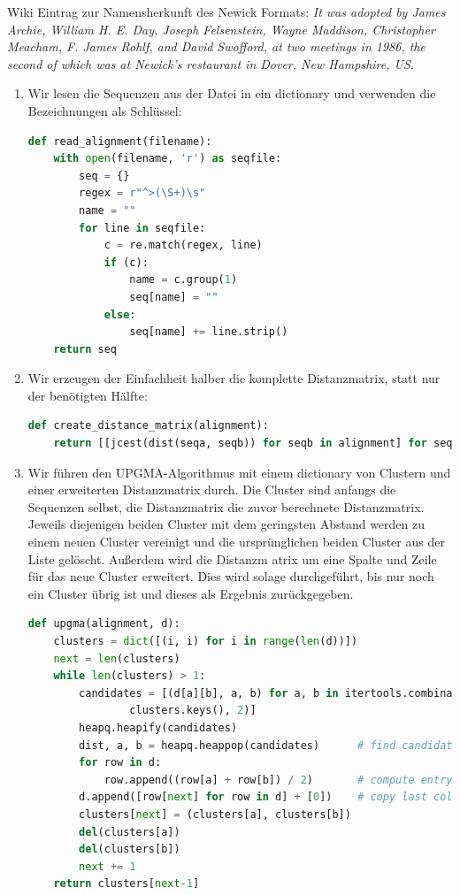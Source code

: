 \documentclass{homework}
\begin{document}
\begin{enumerate}
Wiki Eintrag zur Namensherkunft des Newick Formats: \textit{It was adopted by James Archie, William H. E. Day, Joseph Felsenstein, Wayne Maddison, Christopher Meacham, F. James Rohlf, and David Swofford, at two meetings in 1986, the second of which was at Newick's restaurant in Dover, New Hampshire, US.}

\begin{enumerate}
\item Wir lesen die Sequenzen aus der Datei in ein dictionary und verwenden die
Bezeichnungen als Schlüssel:

\begin{lstlisting}[language=python]
def read_alignment(filename):
	with open(filename, 'r') as seqfile:
		seq = {}
		regex = r"^>(\S+)\s"
		name = ""
		for line in seqfile:
			c = re.match(regex, line)
			if (c):
				name = c.group(1)
				seq[name] = ""
			else:
				seq[name] += line.strip()
	return seq
\end{lstlisting}

\item Wir erzeugen der Einfachheit halber die komplette Distanzmatrix, statt nur
der benötigten Hälfte:

\begin{lstlisting}[language=python]
def create_distance_matrix(alignment):
	return [[jcest(dist(seqa, seqb)) for seqb in alignment] for seqa in alignment]
\end{lstlisting}

\item Wir führen den UPGMA-Algorithmus mit einem dictionary von Clustern und
einer erweiterten Distanzmatrix durch. Die Cluster sind anfangs die Sequenzen
selbst, die Distanzmatrix die zuvor berechnete Distanzmatrix. Jeweils diejenigen
beiden Cluster mit dem geringsten Abstand werden zu einem neuen Cluster
vereinigt und die ursprünglichen beiden Cluster aus der Liste gelöscht.
Außerdem wird die Distanzm	atrix um eine Spalte und Zeile für das neue Cluster
erweitert. Dies wird solage durchgeführt, bis nur noch ein Cluster übrig ist und
dieses als Ergebnis zurückgegeben.

\begin{lstlisting}[language=python]
def upgma(alignment, d):
	clusters = dict([(i, i) for i in range(len(d))])
	next = len(clusters)
	while len(clusters) > 1:
		candidates = [(d[a][b], a, b) for a, b in itertools.combinations(
				clusters.keys(), 2)]
		heapq.heapify(candidates)
		dist, a, b = heapq.heappop(candidates)		# find candidate with least distance
		for row in d:
			row.append((row[a] + row[b]) / 2)		# compute entry for new column
		d.append([row[next] for row in d] + [0])	# copy last column to new row
		clusters[next] = (clusters[a], clusters[b])
		del(clusters[a])
		del(clusters[b])
		next += 1
	return clusters[next-1]
\end{lstlisting}


\end{enumerate}
\end{enumerate}
\end{document}
